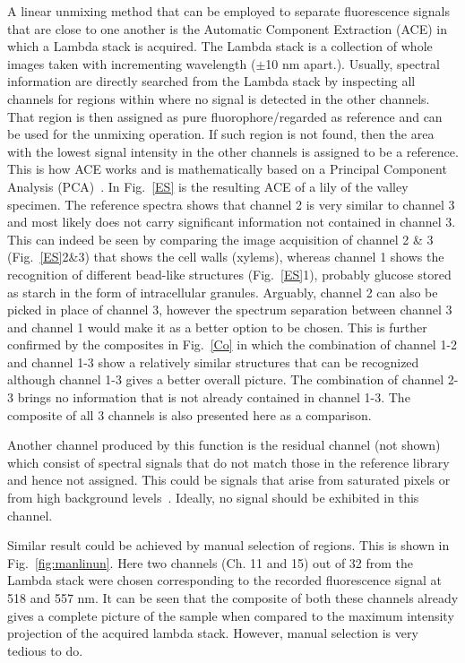 A linear unmixing method that can be employed to separate fluorescence signals that are close to one another is the Automatic Component Extraction (ACE) in which a Lambda stack is acquired. 
The Lambda stack is a collection of whole images taken with incrementing wavelength ($\pm$10 nm apart.). 
Usually, spectral information are directly searched from the Lambda stack by inspecting all channels for regions within where no signal is detected in the other channels. 
That region is then assigned as pure fluorophore/regarded as reference and can be used for the unmixing operation. 
If such region is not found, then the area with the lowest signal intensity in the other channels is assigned to be a reference.
This is how ACE works and is mathematically based on a Principal Component Analysis (PCA)~\cite{ZeissCamp2}.
In Fig.~\ref{ES} is the resulting ACE of a lily of the valley specimen. 
The reference spectra shows that channel 2 is very similar to channel 3 and most likely does not carry significant information not contained in channel 3. 
This can indeed be seen by comparing the image acquisition of channel 2 \& 3 (Fig.~\ref{ES}2\&3) that shows the cell walls (xylems), whereas channel 1 shows the recognition of different bead-like structures (Fig.~\ref{ES}1), probably glucose stored as starch in the form of intracellular granules. 
Arguably, channel 2 can also be picked in place of channel 3, however the spectrum separation between channel 3 and channel 1 would make it as a better option to be chosen. 
This is further confirmed by the composites in Fig.~\ref{Co} in which the combination of channel 1-2 and channel 1-3 show a relatively similar structures that can be recognized although channel 1-3 gives a better overall picture. 
The combination of channel 2-3 brings no information that is not already contained in channel 1-3. 
The composite of all 3 channels is also presented here as a comparison. 

Another channel produced by this function is the residual channel (not shown) which consist of spectral signals that do not match those in the reference library and hence not assigned. 
This could be signals that arise from saturated pixels or from high background levels~\cite{ZeissCamp2}. 
Ideally, no signal should be exhibited in this channel. 

Similar result could be achieved by manual selection of regions. 
This is shown in Fig.~\ref{fig:manlinun}. Here two channels (Ch. 11 and 15) out of 32 from the Lambda stack were chosen corresponding to the recorded fluorescence signal at 518 and 557 nm. 
It can be seen that the composite of both these channels already gives a complete picture of the sample when compared to the maximum intensity projection of the acquired lambda stack. 
However, manual selection is very tedious to do. 

